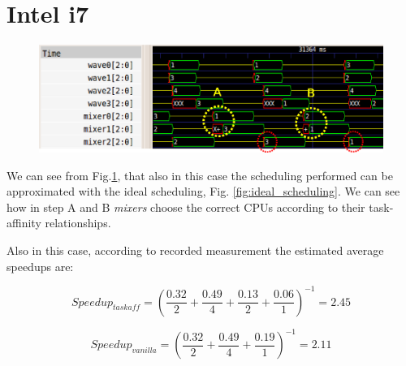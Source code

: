\newpage
\section{Intel i7}

\begin{figure}[htbp]
\centering
\includegraphics[width=\widefigure]{images/results_i7/final_i7.eps}
\caption{}
\label{fig:trace_i7}
\end{figure}

We can see from Fig.\ref{fig:trace_i7}, that also in this case the scheduling performed can be approximated with the ideal scheduling, Fig.
\ref{fig:ideal_scheduling}. We can see how in step A and B \textit{mixers} choose the correct CPUs according to their task-affinity relationships.

Also in this case, according to recorded measurement the estimated average speedups are:

\begin{equation}
  Speedup_{taskaff} = \left(\frac{0.32}{2} + \frac{0.49}{4} + \frac{0.13}{2} + \frac{0.06}{1} \right)^{-1} = 2.45
\label{eq:speedup_i7_taskaff}
\end{equation}

\begin{equation}
  Speedup_{vanilla} = \left(\frac{0.32}{2} + \frac{0.49}{4} + \frac{0.19}{1} \right)^{-1} = 2.11
\label{eq:speedup_i7_van}
\end{equation}

